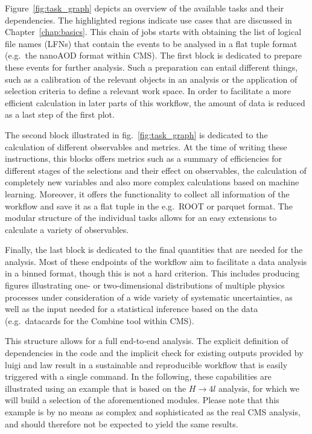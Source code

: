 Figure~\ref{fig:task_graph} depicts an overview of the available tasks and their dependencies.
The highlighted regions indicate use cases that are discussed in Chapter~\ref{chap:basics}.
This chain of jobs starts with obtaining the list of logical file names (LFNs) that contain the events to be analysed in a flat tuple format (e.g.\ the nanoAOD format within CMS).
The first block is dedicated to prepare these events for further analysis.
Such a preparation can entail different things, such as a calibration of the relevant objects in an analysis or the application of selection criteria to define a relevant work space.
In order to facilitate a more efficient calculation in later parts of this workflow, the amount of data is reduced as a last step of the first plot.

The second block illustrated in fig.~\ref{fig:task_graph} is dedicated to the calculation of different observables and metrics.
At the time of writing these instructions, this blocks offers metrics such as a summary of efficiencies for different stages of the selections and their effect on observables, the calculation of completely new variables and also more complex calculations based on machine learning.
Moreover, it offers the functionality to collect all information of the workflow and save it as a flat tuple in the e.g.\ ROOT or parquet format.
The modular structure of the individual tasks allows for an easy extensions to calculate a variety of observables.

Finally, the last block is dedicated to the final quantities that are needed for the analysis.
Most of these endpoints of the workflow aim to facilitate a data analysis in a binned format, though this is not a hard criterion.
This includes producing figures illustrating one- or two-dimensional distributions of multiple physics processes under consideration of a wide variety of systematic uncertainties, as well as the input needed for a statistical inference based on the data (e.g.\ datacards for the Combine tool within CMS).

This structure allows for a full end-to-end analysis.
The explicit definition of dependencies in the code and the implicit check for existing outputs provided by luigi and law result in a sustainable and reproducible workflow that is easily triggered with a single command.
In the following, these capabilities are illustrated using an example that is based on the $H\rightarrow4l$ analysis, for which we will build a selection of the aforementioned modules.
Please note that this example is by no means as complex and sophisticated as the real CMS analysis, and should therefore not be expected to yield the same results.